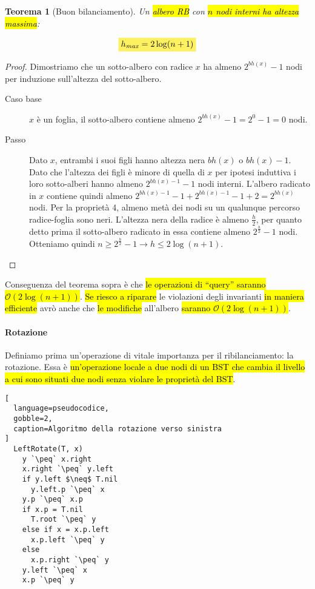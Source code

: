 \documentclass[a4paper,11pt,twoside]{article}
\theoremstyle{plain}
\newtheorem{thm}{Teorema}[section]
\theoremstyle{definition}
\theoremstyle{remark}
\newcommand{\mhl}[1]{\colorbox{hlcolor}{$\displaystyle #1$}}
\newcommand{\peq}{$\gets$}
\begin{document}
\begin{thm}[Buon bilanciamento]\label{thm:rb-bilanciamento}
  Un \hl{albero RB} con \hl{$n$ nodi interni ha altezza massima}:

  \begin{equation}
    \mhl{
      h_{\mathit{max}} = 2\log(n+1)
    }
  \end{equation}
\end{thm}
\begin{proof}
  Dimostriamo che un sotto-albero con radice $x$ ha almeno $2^{bh(x)} - 1$ nodi
  per induzione sull'altezza del sotto-albero.

  \begin{description}
    \item[Caso base] $x$ è un foglia, il sotto-albero contiene almeno
      $2^{bh(x)} - 1 = 2^0 - 1 = 0$ nodi.
    \item[Passo] Dato $x$, entrambi i suoi figli hanno altezza nera $bh(x)$ o
      $bh(x) - 1$. Dato che l'altezza dei figli è minore di quella di $x$ per
      ipotesi induttiva i loro sotto-alberi hanno almeno $2^{bh(x)-1} - 1$ nodi
      interni. L'albero radicato in $x$ contiene quindi almeno
      $2^{bh(x)-1} - 1 + 2^{bh(x)-1} - 1 + 2 = 2^{bh(x)}$ nodi. Per la proprietà
      4, almeno metà dei nodi su un qualunque percorso radice-foglia sono neri.
      L'altezza nera della radice è almeno $\frac{h}{2}$, per quanto detto prima
      il sotto-albero radicato in essa contiene almeno $2^\frac{h}{2} - 1$ nodi.
      Otteniamo quindi $n \geq 2^\frac{h}{2} - 1 \to h \leq 2\log(n + 1)$.
  \end{description}
\end{proof}

Conseguenza del teorema sopra è che \hl{le operazioni di ``query'' saranno
$\mathcal{O}(2\log(n+1))$}. \hl{Se riesco a riparare} le violazioni degli
invarianti \hl{in maniera efficiente} avrò anche che \hl{le modifiche}
all'albero \hl{saranno $\mathcal{O}(2\log(n+1))$}.

\paragraph{Rotazione} Definiamo prima un'operazione di vitale importanza per il
ribilanciamento: la rotazione. Essa è \hl{un'operazione locale a due nodi di un BST
che cambia il livello a cui sono situati due nodi senza violare le proprietà del
BST}.

\begin{lstlisting}[
  language=pseudocodice,
  gobble=2,
  caption=Algoritmo della rotazione verso sinistra
]
  LeftRotate(T, x)
    y `\peq` x.right
    x.right `\peq` y.left
    if y.left $\neq$ T.nil
      y.left.p `\peq` x
    y.p `\peq` x.p
    if x.p = T.nil
      T.root `\peq` y
    else if x = x.p.left
      x.p.left `\peq` y
    else
      x.p.right `\peq` y
    y.left `\peq` x
    x.p `\peq` y
\end{lstlisting}
\end{document}
